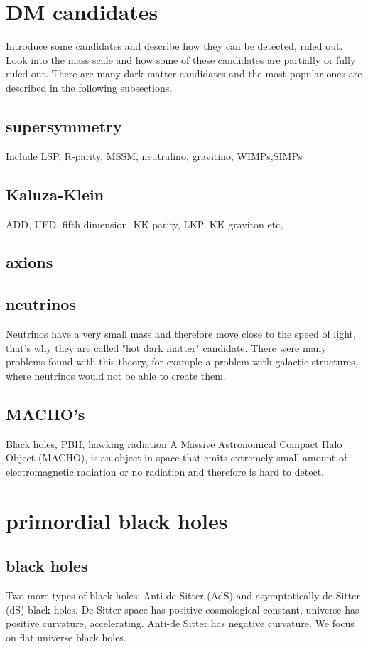 ﻿\documentclass{article}
\begin{document}
\section {DM candidates}
Introduce some candidates and describe how they can be detected, ruled out. 
Look into the mass scale and how some of these candidates are partially or fully ruled out. 
There are many dark matter candidates and the most popular ones are described in the following subsections. 
\subsection{supersymmetry}

Include LSP, R-parity, MSSM, neutralino, gravitino, WIMPs,SIMPs 

\subsection{Kaluza-Klein}
ADD, UED, fifth dimension, KK parity, LKP, KK graviton etc, 

\subsection {axions}

\subsection {neutrinos}
Neutrinos have a very small mass and therefore move close to the speed of light, that's why they are called "hot dark matter" candidate. There were many problems found with this theory, for example a problem with galactic structures, where neutrinos would not be able to create them. 
\subsection{MACHO's}
Black holes, PBH, hawking radiation 
A Massive Astronomical Compact Halo Object (MACHO), is an object in space that emits extremely small amount of electromagnetic radiation or no radiation and therefore is hard to detect. 
\section{primordial black holes}
\subsection {black holes}
Two more types of black holes: Anti-de Sitter (AdS) and asymptotically de Sitter (dS) black holes.
De Sitter space has positive cosmological constant, universe has positive curvature, accelerating. 
Anti-de Sitter has negative curvature. We focus on flat universe black holes. 
\end{document}
